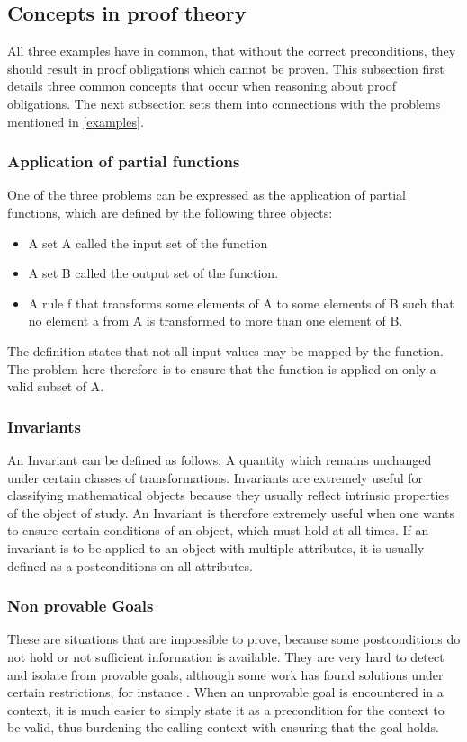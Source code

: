 \subsection{Concepts in proof theory}
All three examples have in common, that without the correct preconditions, they should result in proof obligations which cannot be proven.
This subsection first details three common concepts that occur when reasoning about proof obligations. The next subsection sets them into connections with the problems mentioned in \ref{examples}.
\subsubsection{Application of partial functions} \label{partial function}
One of the three problems can be expressed as the application of partial functions, which are defined by the following three objects:
\begin{itemize}
	\item A set A called the input set of the function
	\item A set B called the output set of the function.
	\item A rule f that transforms some elements of A to some elements of B such that no element a from A is transformed to more than one element of B.\cite[197]{khoussainov}
\end{itemize}
The definition states that not all input values may be mapped by the function. The problem here therefore is to ensure that the function is applied on only a valid subset of A.
\subsubsection{Invariants} \label{invariants}
An Invariant can be defined as follows: A quantity which remains unchanged under certain classes of transformations. Invariants are extremely useful for classifying mathematical objects because they usually reflect intrinsic properties of the object of study.\cite[282ff]{hunt}\newline
An Invariant is therefore extremely useful when one wants to ensure certain conditions of an object, which must hold at all times. If an invariant is to be applied to an object with multiple attributes, it is usually defined as a postconditions on all attributes. 
\subsubsection{Non provable Goals} \label{non provable goal}
These are situations that are impossible to prove, because some postconditions do not hold or not sufficient information is available. They are very hard to detect and isolate from provable goals, although some work has found solutions under certain restrictions, for instance \cite{goals}. When an unprovable goal is encountered in a context, it is much easier to simply state it as a precondition for the context to be valid, thus burdening the calling context with ensuring that the goal holds. 
